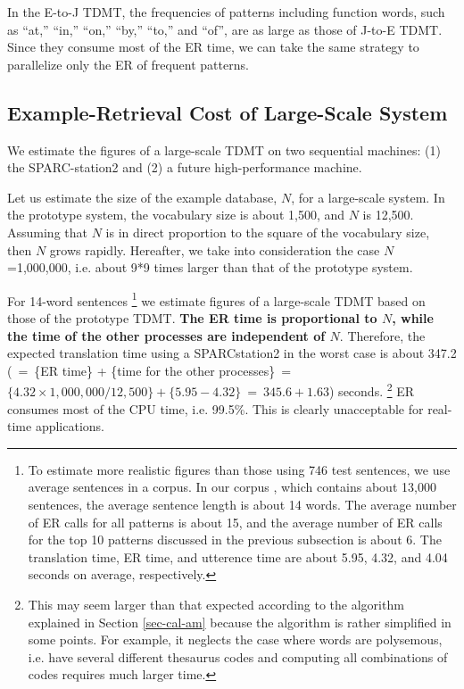 In the E-to-J TDMT, the frequencies of
patterns including
function words,  such as ``at,'' ``in,'' ``on,'' 
``by,'' ``to,'' and ``of'', are as large as
those of J-to-E TDMT. 
Since they consume most of the ER time, we can take the same strategy 
to parallelize only the ER of frequent patterns.

\subsection{Example-Retrieval Cost of Large-Scale System}\label{sec-limit}
We estimate the figures of a large-scale TDMT
on two sequential machines:
(1) the SPARC-station2 and (2) a future high-performance machine.

Let us estimate the size of the example database, $N$, for 
a large-scale system.
 In the prototype system, the vocabulary size is about 1,500,
and $N$ is  12,500.
Assuming that  $N$ is in direct proportion to 
the square of the vocabulary size, then   $N$ grows rapidly.
Hereafter, we take  into consideration 
the case  $N$=1,000,000, i.e. about  9*9 times larger 
than that of the prototype system.

For 14-word sentences
\footnote{To estimate more realistic figures than those using 
746 test sentences, we use average sentences in a corpus.
In our corpus \cite{Ehara90}, which contains about
13,000 sentences, the average 
sentence length is about 14 words.
The average number of ER calls for all patterns 
is about 15,
and the average number of ER calls for the top 10 patterns discussed in 
the previous subsection is about 6.
The translation time, ER time, and utterence time
are about 5.95, 4.32, and 4.04 seconds on average, respectively. 
}
we estimate figures of a 
large-scale TDMT based on those of the prototype TDMT.
{\bf The ER time is proportional to $N$, while the time of the 
other processes are independent of $N$}.
Therefore,  the expected translation time 
using a SPARCstation2 
in the worst case is about 347.2 (~=~\{ER time\}
 + \{time for the other processes\}~=~$\{4.32\times 1,000,000/12,500\} 
+ \{5.95-4.32\}~=~345.6+1.63$) seconds.
\footnote{
This may seem larger than that expected according to the 
algorithm explained in Section \ref{sec-cal-am}
because the algorithm is rather simplified in some points. For example, 
it neglects the case where words are polysemous, i.e. have 
several different thesaurus codes and computing all combinations 
of codes requires 
much larger time.}
ER consumes most of the CPU time, i.e. 99.5\%.
This is clearly unacceptable for real-time applications.

